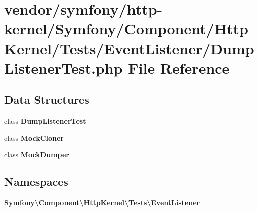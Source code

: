 \section{vendor/symfony/http-\/kernel/\+Symfony/\+Component/\+Http\+Kernel/\+Tests/\+Event\+Listener/\+Dump\+Listener\+Test.php File Reference}
\label{_dump_listener_test_8php}
\subsection*{Data Structures}
\begin{DoxyCompactItemize}
\item 
class {\bf Dump\+Listener\+Test}
\item 
class {\bf Mock\+Cloner}
\item 
class {\bf Mock\+Dumper}
\end{DoxyCompactItemize}
\subsection*{Namespaces}
\begin{DoxyCompactItemize}
\item 
 {\bf Symfony\textbackslash{}\+Component\textbackslash{}\+Http\+Kernel\textbackslash{}\+Tests\textbackslash{}\+Event\+Listener}
\end{DoxyCompactItemize}
